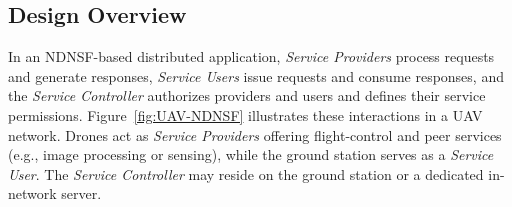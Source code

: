 



\subsection{Design Overview}

In an NDNSF-based distributed application, \emph{Service Providers} process requests and generate responses, \emph{Service Users} issue requests and consume responses, and the \emph{Service Controller} authorizes providers and users and defines their service permissions.  Figure~\ref{fig:UAV-NDNSF} illustrates these interactions in a UAV network. Drones act as \emph{Service Providers} offering flight-control and peer services (e.g., image processing or sensing), while the ground station serves as a \emph{Service User}. The \emph{Service Controller} may reside on the ground station or a dedicated in-network server.


